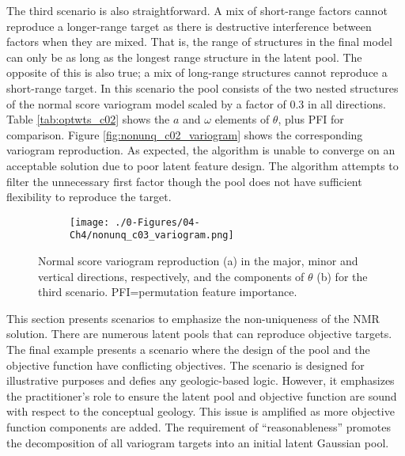 The third scenario is also straightforward. A mix of short-range factors cannot reproduce a longer-range target as there is destructive interference between factors when they are mixed. That is, the range of structures in the final model can only be as long as the longest range structure in the latent pool. The opposite of this is also true; a mix of long-range structures cannot reproduce a short-range target. In this scenario the pool consists of the two nested structures of the normal score variogram model scaled by a factor of 0.3 in all directions. Table \ref{tab:optwts_c02} shows the $a$ and $\omega$ elements of $\theta$, plus \gls{PFI} for comparison. Figure \ref{fig:nonunq_c02_variogram} shows the corresponding variogram reproduction. As expected, the algorithm is unable to converge on an acceptable solution due to poor latent feature design. The algorithm attempts to filter the unnecessary first factor though the pool does not have sufficient flexibility to reproduce the target.

\begin{figure}
    \begin{subfigure}{1.\textwidth}
        \centering
        \texttt{[image: ./0-Figures/04-Ch4/nonunq\_c03\_variogram.png]}
        \caption{}
        \label{fig:nonunq_c03_variogram}
    \end{subfigure}
    \begin{subtable}{1.\textwidth}
        \centering
        \resizebox{1\width}{!}{}
        \caption{}
        \label{tab:optwts_c03}
    \end{subtable}
    \caption{Normal score variogram reproduction (a) in the major, minor and vertical directions, respectively, and the components of $\theta$ (b) for the third scenario. PFI=permutation feature importance. }
    \label{}
\end{figure}

This section presents scenarios to emphasize the non-uniqueness of the \gls{NMR} solution. There are numerous latent pools that can reproduce objective targets. The final example presents a scenario where the design of the pool and the objective function have conflicting objectives. The scenario is designed for illustrative purposes and defies any geologic-based logic. However, it emphasizes the practitioner's role to ensure the latent pool and objective function are sound with respect to the conceptual geology. This issue is amplified as more objective function components are added. The requirement of ``reasonableness'' promotes the decomposition of all variogram targets into an initial latent Gaussian pool.

